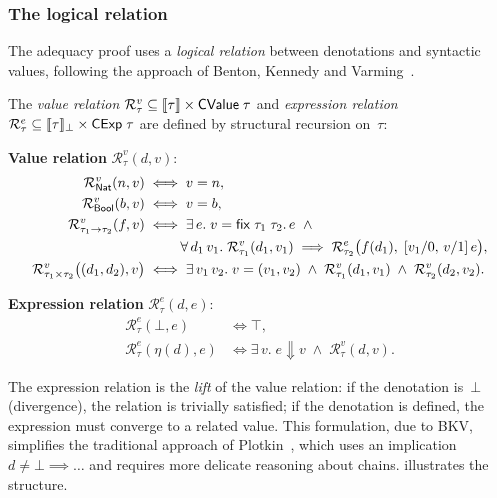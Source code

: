 \subsubsection*{The logical relation}

The adequacy proof uses a \emph{logical relation} between denotations
and syntactic values, following the approach of Benton, Kennedy and
Varming~\cite{BKV2009}.

\begin{definition}
\label{def:logical-relation}
The \emph{value relation} $\mathcal{R}^v_\tau \subseteq \llbracket \tau \rrbracket
\times \mathsf{CValue}\;\tau$ and \emph{expression relation}
$\mathcal{R}^e_\tau \subseteq \llbracket \tau \rrbracket_\bot \times
\mathsf{CExp}\;\tau$ are defined by structural recursion on~$\tau$:

\medskip\noindent
\textbf{Value relation} $\mathcal{R}^v_\tau(d, v)$:
\begin{align*}
  \mathcal{R}^v_{\mathsf{Nat}}(n, v) &\iff v = n, \\
  \mathcal{R}^v_{\mathsf{Bool}}(b, v) &\iff v = b, \\
  \mathcal{R}^v_{\tau_1 \to \tau_2}(f, v) &\iff
    \exists\, e.\; v = \mathsf{fix}\;\tau_1\;\tau_2.\,e \;\;\land \\
    &\qquad\;\; \forall\, d_1\, v_1.\;
      \mathcal{R}^v_{\tau_1}(d_1, v_1)
      \implies \mathcal{R}^e_{\tau_2}\bigl(f(d_1),\;
        [v_1/0,\, v/1]\,e\bigr), \\
  \mathcal{R}^v_{\tau_1 \times \tau_2}\bigl((d_1, d_2), v\bigr) &\iff
    \exists\, v_1\, v_2.\; v = (v_1, v_2) \;\land\;
    \mathcal{R}^v_{\tau_1}(d_1, v_1) \;\land\;
    \mathcal{R}^v_{\tau_2}(d_2, v_2).
\end{align*}

\noindent
\textbf{Expression relation} $\mathcal{R}^e_\tau(d, e)$:
\begin{align*}
  \mathcal{R}^e_\tau(\bot, e) &\iff \top, \\
  \mathcal{R}^e_\tau(\eta(d), e) &\iff
    \exists\, v.\; e \Downarrow v \;\land\;
    \mathcal{R}^v_\tau(d, v).
\end{align*}
\end{definition}

The expression relation is the \emph{lift} of the value relation: if the
denotation is~$\bot$ (divergence), the relation is trivially satisfied;
if the denotation is defined, the expression must converge to a related
value.  This formulation, due to BKV, simplifies the traditional
approach of Plotkin~\cite{Plotkin1977}, which uses an implication
$d \neq \bot \implies \ldots$ and requires more delicate reasoning about
chains.   illustrates the structure.

